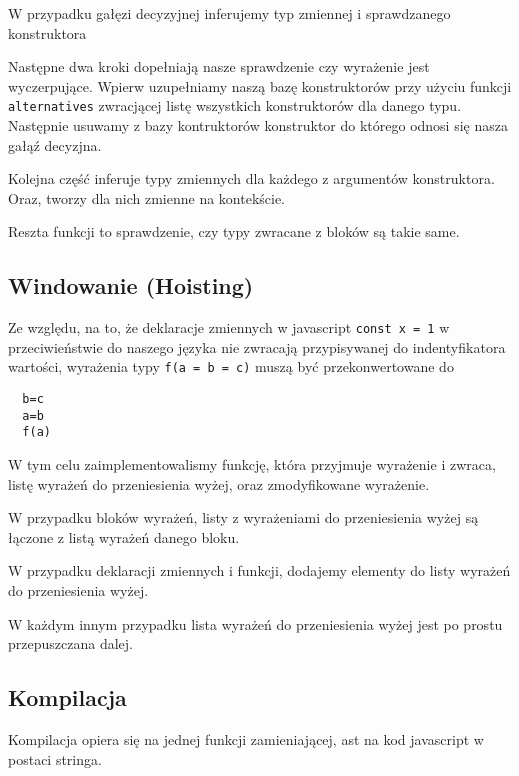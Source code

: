 \documentclass{article}
\begin{document}
W przypadku gałęzi decyzyjnej inferujemy typ zmiennej i sprawdzanego konstruktora

Następne dwa kroki dopełniają nasze sprawdzenie czy wyrażenie jest wyczerpujące. Wpierw uzupełniamy naszą bazę konstruktorów przy użyciu funkcji \lstinline{alternatives} zwracjącej listę wszystkich konstruktorów dla danego typu.
Następnie usuwamy z bazy kontruktorów konstruktor do którego odnosi się nasza gałąź decyzjna.


Kolejna część inferuje typy zmiennych dla każdego z argumentów konstruktora.
Oraz, tworzy dla nich zmienne na kontekście.\newpage

Reszta funkcji to sprawdzenie, czy typy zwracane z bloków są takie same.



\subsection{Windowanie (Hoisting)}
Ze względu, na to, że deklaracje zmiennych w javascript \lstinline{const x = 1} w przeciwieństwie do naszego języka nie zwracają przypisywanej do indentyfikatora wartości, wyrażenia typy \lstinline{f(a = b = c)} muszą być przekonwertowane do
\begin{lstlisting}
  b=c
  a=b
  f(a)
\end{lstlisting}
W tym celu zaimplementowalismy funkcję, która przyjmuje wyrażenie i zwraca, listę wyrażeń do przeniesienia wyżej, oraz zmodyfikowane wyrażenie.

W przypadku bloków wyrażeń, listy z wyrażeniami do przeniesienia wyżej są łączone z listą wyrażeń danego bloku.



W przypadku deklaracji zmiennych i funkcji, dodajemy elementy do listy wyrażeń do przeniesienia wyżej.\newpage

W każdym innym przypadku lista wyrażeń do przeniesienia wyżej jest po prostu przepuszczana dalej.



\subsection{Kompilacja}
Kompilacja opiera się na jednej funkcji zamieniającej, ast na kod javascript w postaci stringa.
\end{document}
